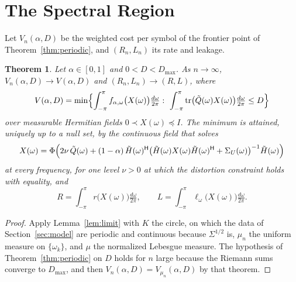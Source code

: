 \documentclass[11pt,onecolumn]{IEEEtran}
\newtheorem{theorem}{Theorem}
\newcommand{\tr}{\operatorname{tr}}
\newcommand{\tQ}{\tilde Q}
\newcommand{\tH}{\tilde H}
\newcommand{\dw}{\tfrac{d\omega}{2\pi}}
\newcommand{\herm}{\mathsf H}
\begin{document}
\section{The Spectral Region}
\label{sec:spectral}

Let $V_n(\alpha,D)$ be the weighted cost per symbol of the frontier
point of Theorem~\ref{thm:periodic}, and $(R_n,L_n)$ its rate and
leakage.

\begin{theorem}\label{thm:spectral}
Let $\alpha\in[0,1]$ and $0<D<D_{\max}$. As $n\to\infty$,
$V_n(\alpha,D)\to V(\alpha,D)$ and $(R_n,L_n)\to(R,L)$, where
\begin{equation}
V(\alpha,D)=\min\Bigl\{\int_{-\pi}^{\pi}f_{\alpha,\omega}\bigl(X(\omega)\bigr)\dw:\
\int_{-\pi}^{\pi}\tr\bigl(\tQ(\omega)X(\omega)\bigr)\dw\le D\Bigr\}
\label{eq:spectralprogram}
\end{equation}
over measurable Hermitian fields $0\prec X(\omega)\preceq I$. The minimum
is attained, uniquely up to a null set, by the continuous field that
solves
\begin{equation}
X(\omega)=\Phi\Bigl(2\nu\,\tQ(\omega)+(1-\alpha)\,\tH(\omega)^{\herm}\bigl(\tH(\omega)X(\omega)\tH(\omega)^{\herm}+\Sigma_U(\omega)\bigr)^{-1}\tH(\omega)\Bigr)
\label{eq:spectral}
\end{equation}
at every frequency, for one level $\nu>0$ at which the distortion
constraint holds with equality, and
\[
R=\int_{-\pi}^{\pi}r\bigl(X(\omega)\bigr)\dw,\qquad
L=\int_{-\pi}^{\pi}\ell_\omega\bigl(X(\omega)\bigr)\dw .
\]
\end{theorem}

\begin{proof}
Apply Lemma~\ref{lem:limit} with $K$ the circle, on which the data of
Section~\ref{sec:model} are periodic and continuous because
$\Sigma^{1/2}$ is,
$\mu_n$ the uniform measure on $\{\omega_k\}$, and $\mu$ the normalized
Lebesgue measure. The hypothesis of Theorem~\ref{thm:periodic} on $D$
holds for $n$ large because the Riemann sums converge to $D_{\max}$, and
then $V_n(\alpha,D)=V_{\mu_n}(\alpha,D)$ by that theorem.
\end{proof}
\end{document}
